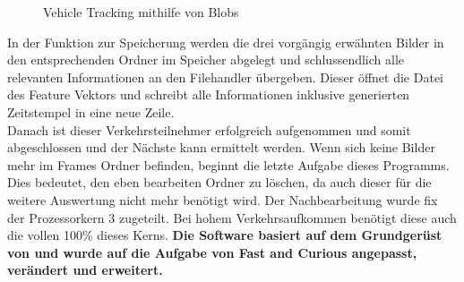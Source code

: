 \begin{figure}[H]
\caption{Vehicle Tracking mithilfe von Blobs}
\label{bMotionDetection}
\end{figure}

In der Funktion zur Speicherung werden die drei vorgängig erwähnten Bilder in den entsprechenden Ordner im Speicher abgelegt und schlussendlich alle relevanten Informationen an den Filehandler übergeben. Dieser öffnet die Datei des Feature Vektors und schreibt alle Informationen inklusive generierten Zeitstempel in eine neue Zeile.\\
Danach ist dieser Verkehrsteilnehmer erfolgreich aufgenommen und somit abgeschlossen und der Nächste kann ermittelt werden.
Wenn sich keine Bilder mehr im Frames Ordner befinden, beginnt die letzte Aufgabe dieses Programms. Dies bedeutet, den eben bearbeiten Ordner zu löschen, da auch dieser für die weitere Auswertung nicht mehr benötigt wird. Der Nachbearbeitung wurde fix der Prozessorkern 3 zugeteilt. Bei hohem Verkehrsaufkommen benötigt diese auch die vollen 100\% dieses Kerns. \textbf{Die Software basiert auf dem Grundgerüst von \cite{OpenCVCC} und wurde auf die Aufgabe von Fast and Curious angepasst, verändert und erweitert.}

